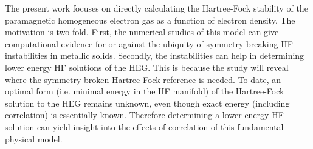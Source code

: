 \documentclass[preprint, journal=prl]{revtex4-1}
\begin{document}
  The present work focuses on directly calculating the Hartree-Fock stability of the paramagnetic homogeneous electron gas as a function of electron density. The motivation is two-fold. First, the numerical studies of this model can give computational evidence for or against the ubiquity of symmetry-breaking HF instabilities in metallic solids. Secondly, the instabilities can help in determining lower energy HF solutions of the HEG. This is because the study will reveal where the symmetry broken Hartree-Fock reference is needed. To date, an optimal form (i.e. minimal energy in the HF manifold) of the Hartree-Fock solution to the HEG remains unknown, even though exact energy (including correlation) is essentially known. Therefore determining a lower energy HF solution can yield insight into the effects of correlation of this fundamental physical model.
        
  
    
\end{document}

